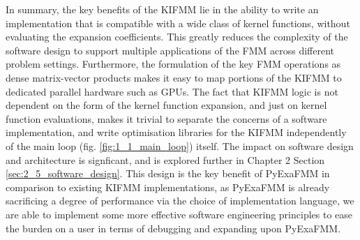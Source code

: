 In summary, the key benefits of the \gls{KIFMM} lie in the ability to write
an implementation that is compatible with a wide class of kernel functions,
without evaluating the expansion coefficients. This greatly reduces the complexity
of the software design to support multiple applications of the FMM across
different problem settings. Furthermore, the formulation of the key FMM operations
as dense matrix-vector products makes it easy to map portions of the \gls{KIFMM}
to dedicated parallel hardware such as \gls{GPU}s. The fact that KIFMM logic
is not dependent on the form of the kernel function expansion, and just on kernel
function evaluations,  makes it trivial to separate the concerns of a software
implementation, and write optimisation libraries for the KIFMM independently of
the main loop (fig. \ref{fig:1_1_main_loop}) itself. The impact on software design
and architecture is signficant, and is explored further in Chapter 2 Section
\ref{sec:2_5_software_design}. This design is the key benefit of PyExaFMM
in comparison to existing \gls{KIFMM} implementations, as PyExaFMM is already
sacrificing a degree of performance via the choice of implementation language,
we are able to implement some more effective software engineering principles
to ease the burden on a user in terms of debugging and expanding upon PyExaFMM.
